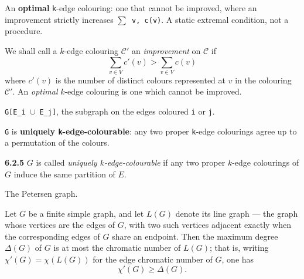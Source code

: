 \begin{definition}
\label{SimpleGraph.IsOptimalEdgeColouring}
\leanok
{}
An \textbf{optimal} \texttt{k}-edge colouring: one that cannot be improved, where an
improvement strictly increases \texttt{$\sum$ v, c(v)}. A static extremal condition, not
a procedure.

We shall call a $k$-edge colouring $\mathscr{C}'$ an \emph{improvement} on $\mathscr{C}$
if \[\sum_{v \in V} c'(v) > \sum_{v \in V} c(v)\] where $c'(v)$ is the number of
distinct colours represented at $v$ in the colouring $\mathscr{C}'$. An \emph{optimal}
$k$-edge colouring is one which cannot be improved.
\end{definition}

\begin{definition}
\label{SimpleGraph.twoColourSubgraph}
\leanok
\texttt{G[E\_i $\cup$ E\_j]}, the subgraph on the edges coloured \texttt{i} or \texttt{j}.
\end{definition}

\begin{definition}
\label{SimpleGraph.IsUniquelyEdgeColourable}
\leanok
\texttt{G} is \textbf{uniquely \texttt{k}-edge-colourable}: any two proper \texttt{k}-edge colourings agree up to a
permutation of the colours.

\textbf{6.2.5} $G$ is called \emph{uniquely $k$-edge-colourable} if any two proper
$k$-edge colourings of $G$ induce the same partition of $E$.
\end{definition}

\begin{definition}
\label{SimpleGraph.petersenGraph}
The Petersen graph.
\end{definition}

\begin{theorem}
\label{SimpleGraph.maxDegree_le_edgeChromaticNumber}
Let $G$ be a finite simple graph, and let $L(G)$ denote its line graph — the graph whose
vertices are the edges of $G$, with two such vertices adjacent exactly when the
corresponding edges of $G$ share an endpoint. Then the maximum degree $\Delta(G)$ of $G$
is at most the chromatic number of $L(G)$; that is, writing $\chi'(G) = \chi(L(G))$ for
the edge chromatic number of $G$, one has \[\chi'(G) \geq \Delta(G).\]
\end{theorem}

